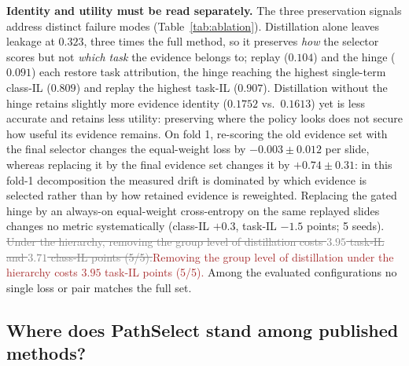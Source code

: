 \documentclass{article}
\newif\ifmarkup \markuptrue
\newcommand{\repc}[3]{\ifmarkup\textcolor{gray}{\sout{#2}}\textcolor{#1}{#3}\else#3\fi}
\newcommand{\repB}[2]{\repc{brown}{#1}{#2}}   %
\begin{document}
\textbf{Identity and utility must be read separately.} The three preservation signals address distinct failure modes (Table~\ref{tab:ablation}). Distillation alone leaves leakage at $0.323$, three times the full method, so it preserves \emph{how} the selector scores but not \emph{which task} the evidence belongs to; replay ($0.104$) and the hinge ($0.091$) each restore task attribution, the hinge reaching the highest single-term class-IL ($0.809$) and replay the highest task-IL ($0.907$). Distillation without the hinge retains slightly more evidence identity ($0.1752$ vs.\ $0.1613$) yet is less accurate and retains less utility: preserving where the policy looks does not secure how useful its evidence remains. On fold 1, re-scoring the old evidence set with the final selector changes the equal-weight loss by $-0.003{\pm}0.012$ per slide, whereas replacing it by the final evidence set changes it by $+0.74{\pm}0.31$: in this fold-1 decomposition the measured drift is dominated by which evidence is selected rather than by how retained evidence is reweighted. Replacing the gated hinge by an always-on equal-weight cross-entropy on the same replayed slides changes no metric systematically (class-IL $+0.3$, task-IL $-1.5$ points; 5 seeds). \repB{Under the hierarchy, removing the group level of distillation costs $3.95$ task-IL and $3.71$ class-IL points (5/5).}{Removing the group level of distillation under the hierarchy costs $3.95$ task-IL points (5/5).} Among the evaluated configurations no single loss or pair matches the full set.

\subsection{Where does PathSelect stand among published methods?}
\label{ssec:sota}
\end{document}
